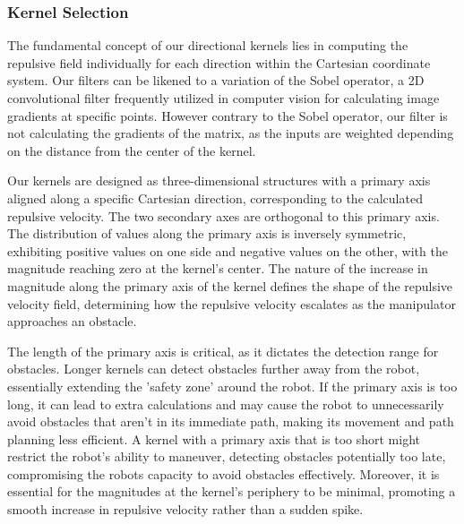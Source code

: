 \documentclass[]{article}
\begin{document}
\subsubsection{Kernel Selection}
\label{chap:kernels}

The fundamental concept of our directional kernels lies in computing the repulsive field individually for each direction within the Cartesian coordinate system. Our filters can be likened to a variation of the Sobel  operator, a 2D convolutional  filter frequently utilized in computer vision for calculating image gradients at specific points. However contrary to the Sobel operator, our filter is not calculating the gradients of the matrix, as the inputs are weighted depending on the distance from the center of the kernel. 

Our kernels are designed as three-dimensional structures with a primary axis aligned along a specific Cartesian direction, corresponding to the calculated repulsive velocity. The two secondary axes are orthogonal to this primary axis. The distribution of values along the primary axis is inversely symmetric, exhibiting positive values on one side and negative values on the other, with the magnitude reaching zero at the kernel's center. The nature of the increase in magnitude along the primary axis of the kernel defines the shape of the repulsive velocity field, determining how the repulsive velocity escalates as the manipulator approaches an obstacle.

The length of the primary axis is critical, as it dictates the detection range for obstacles. Longer kernels can detect obstacles further away
from the robot, essentially extending the ’safety zone’ around the robot. If the primary axis is too long, it can lead to extra calculations and may cause the robot to unnecessarily avoid obstacles that aren't in its immediate path, making its movement and path planning less efficient. A kernel with a primary axis that is too short might restrict the robot's ability to maneuver, detecting obstacles potentially too late, compromising the robots capacity to avoid obstacles effectively.  Moreover, it is essential for the magnitudes at the kernel's periphery to be minimal, promoting a smooth increase in repulsive velocity rather than a sudden spike.
\end{document}
